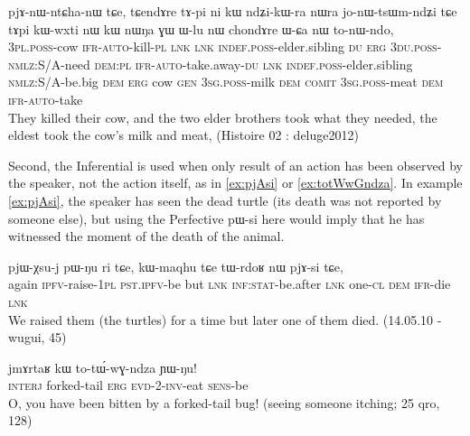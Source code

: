 \documentclass[oldfontcommands,oneside,a4paper,11pt]{article}
\newcommand{\ipa}[1]{{\phon \mbox{#1}}} %
\begin{document}
\begin{exe}
\ex \label{ex:pjAnWntChanW}
\gll  \ipa{nɯ-nɯŋa} 	\ipa{pjɤ-nɯ-ntɕha-nɯ} 	\ipa{tɕe,} \ipa{tɕendɤre} 	\ipa{tɤ-pi} 	\ipa{ni} 	\ipa{kɯ} 	\ipa{ndʑi-kɯ-ra} 	\ipa{nɯra} 	\ipa{jo-nɯ-tsɯm-ndʑi} 	\ipa{tɕe} \ipa{tɤpi} 	\ipa{kɯ-wxti} 	\ipa{nɯ} 	\ipa{kɯ} 	\ipa{nɯŋa} 	\ipa{ɣɯ} 	 \ipa{ɯ-lu} 	\ipa{nɯ} 	\ipa{chondɤre} \ipa{ɯ-ɕa} 	\ipa{nɯ} 	\ipa{to-nɯ-ndo,} \\
\textsc{3pl.poss}-cow \textsc{ifr}-\textsc{auto}-kill-\textsc{pl} \textsc{lnk}  \textsc{lnk} \textsc{indef.poss}-elder.sibling \textsc{du} \textsc{erg} \textsc{3du.poss}-\textsc{nmlz}:S/A-need \textsc{dem:pl} \textsc{ifr}-\textsc{auto}-take.away-\textsc{du} \textsc{lnk} \textsc{indef.poss}-elder.sibling \textsc{nmlz}:S/A-be.big \textsc{dem} \textsc{erg} cow \textsc{gen} \textsc{3sg.poss}-milk \textsc{dem} \textsc{comit}  \textsc{3sg.poss}-meat  \textsc{dem} \textsc{ifr}-\textsc{auto}-take \\
\glt They killed their cow, and the two elder brothers took what they needed, the eldest took the cow's milk and meat, (Histoire 02 : deluge2012)
\end{exe}



Second, the Inferential is used when only result of an action has been observed by the speaker, not the action itself, as in \ref{ex:pjAsi} or \ref{ex:totWwGndza}. In example \ref{ex:pjAsi}, the speaker has seen the dead turtle (its death was not reported by someone else), but using the Perfective \ipa{pɯ-si}  here would imply that he has witnessed the moment of the death of the animal. 

\begin{exe}
\ex  \label{ex:pjAsi}
\gll \ipa{li} 	\ipa{pjɯ-χsu-j} 	\ipa{pɯ-ŋu} 	\ipa{ri} 	\ipa{tɕe,} \ipa{kɯ-maqhu} 	\ipa{tɕe} 	\ipa{tɯ-rdoʁ} 	\ipa{nɯ} 	\ipa{pjɤ-si} 	\ipa{tɕe,} \\
again \textsc{ipfv}-raise-\textsc{1pl} \textsc{pst.ipfv}-be but \textsc{lnk} \textsc{inf:stat}-be.after \textsc{lnk}  one-\textsc{cl} \textsc{dem} \textsc{ifr}-die \textsc{lnk} \\
\glt We raised them (the turtles) for a time but later one of them died. (14.05.10 - wugui, 45)
\end{exe}


\begin{exe}
\ex \label{ex:totWwGndza}
\gll \ipa{wo}	\ipa{jmɤrtaʁ} 	\ipa{kɯ} 	\ipa{to-tɯ́-wɣ-ndza} 	\ipa{ɲɯ-ŋu!} \\
\textsc{interj} forked-tail \textsc{erg} \textsc{evd-2-inv}-eat \textsc{sens}-be\\
\glt O, you have been bitten by a forked-tail bug! (seeing someone itching; 25 qro, 128)
\end{exe}
\end{document}
